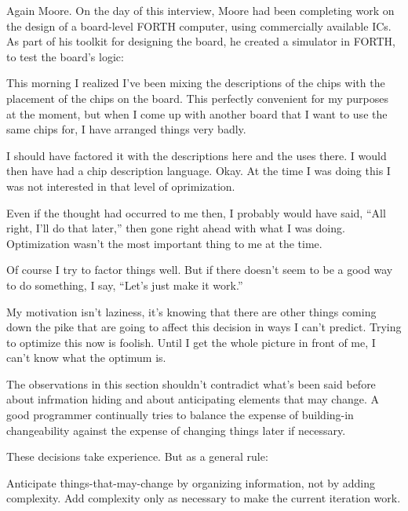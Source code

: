 \begin{interview}
Again Moore. On the day of this interview, Moore had been completing work on the design of a board-level FORTH computer, using commercially available ICs. As part of his toolkit for designing the board, he created a simulator in FORTH, to test the board's logic:

\begin{tfquot}
This morning I realized I've been mixing the descriptions of the chips with the placement of the chips on the board. This perfectly convenient for my purposes at the moment, but when I come up with another board that I want to use the same chips for, I have arranged things very badly.

I should have factored it with the descriptions here and the uses there. I would then have had a chip description language. Okay. At the time I was doing this I was not interested in that level of oprimization.

Even if the thought had occurred to me then, I probably would have said, ``All right, I'll do that later,'' then gone right ahead with what I was doing. Optimization wasn't the most important thing to me at the time.

Of course I try to factor things well. But if there doesn't seem to be a good way to do something, I say, ``Let's just make it work.''

My motivation isn't laziness, it's knowing that there are other things coming down the pike that are going to affect this decision in ways I can't predict. Trying to optimize this now is foolish. Until I get the whole picture in front of me, I can't know what the optimum is.
\end{tfquot}
\end{interview}
The observations in this section shouldn't contradict what's been said before about infrmation hiding and about anticipating elements that may change. A good programmer continually tries to balance the expense of building-in changeability against the expense of changing things later if necessary.

These decisions take experience. But as a general rule:

\begin{tip}
Anticipate things-that-may-change by organizing information, not by
adding complexity. Add complexity only as necessary to make the
current iteration work.
\end{tip}

